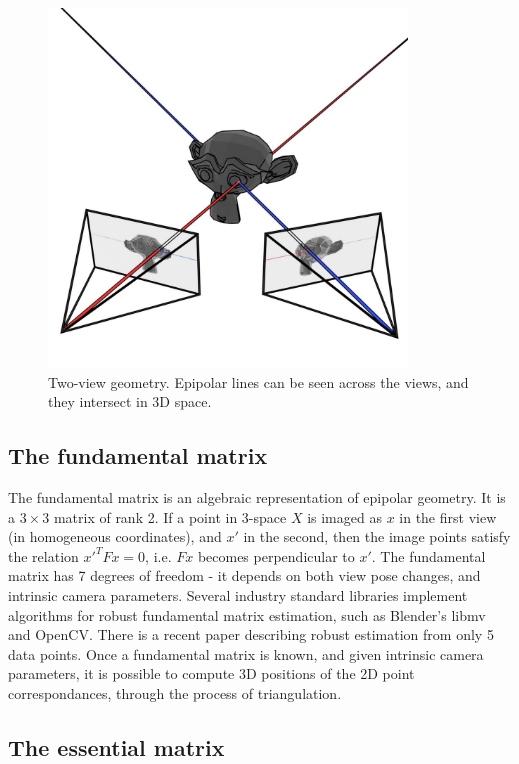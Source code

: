 \documentclass[11pt,english]{report}
\begin{document}
\begin{figure}[!ht]
	\centering
	\includegraphics[width=270pt]{docs/report/epipolar-geometry.jpg}
	\caption{\centering Two-view geometry. Epipolar lines can be seen across the views, and they intersect in 3D space.}
\end{figure}

\subsection{The fundamental matrix}

The fundamental matrix is an algebraic representation of epipolar geometry. It is a $3 \times 3$ matrix of rank 2. If a point in 3-space $X$ is imaged as $x$ in the first view (in homogeneous coordinates), and $x'$ in the second, then the image points satisfy the relation $x'^T F x = 0$\cite{hartley_zisserman_2004}, i.e. $Fx$ becomes perpendicular to $x'$. The fundamental matrix has 7 degrees of freedom - it depends on both view pose changes, and intrinsic camera parameters. Several industry standard libraries implement algorithms for robust fundamental matrix estimation, such as Blender's libmv and OpenCV. There is a recent paper describing robust estimation from only 5 data points\cite{8578130}. Once a fundamental matrix is known, and given intrinsic camera parameters, it is possible to compute 3D positions of the 2D point correspondances, through the process of triangulation.

\subsection{The essential matrix}
\end{document}
